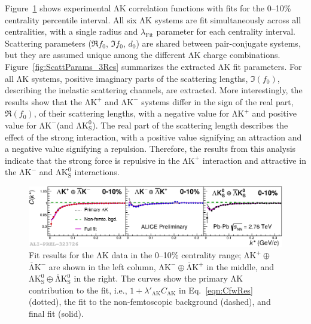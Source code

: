 \documentclass{svproc}
\newcommand{\LamK}{$\mathrm{\Lambda}\mathrm{K}$\xspace}
\newcommand{\LamKchP}{$\mathrm{\Lambda}\mathrm{K^{+}}$\xspace}
\newcommand{\ALamKchM}{$\overline{\mathrm{\Lambda}}\mathrm{K^{-}}$\xspace}
\newcommand{\LamKchM}{$\mathrm{\Lambda}\mathrm{K^{-}}$\xspace}
\newcommand{\ALamKchP}{$\overline{\mathrm{\Lambda}}\mathrm{K^{+}}$\xspace}
\newcommand{\LamKs}{$\mathrm{\Lambda}\mathrm{K^{0}_{S}}$\xspace}
\newcommand{\ALamKs}{$\overline{\mathrm{\Lambda}}\mathrm{K^{0}_{S}}$\xspace}
\begin{document}
Figure~\ref{fig:LamKFits_3Res} shows experimental \LamK correlation functions with fits for the 0--10\% centrality percentile interval.
All six \LamK systems are fit simultaneously across all centralities, with a single radius and $\lambda_{\mathrm{Fit}}$ parameter for each centrality interval.
Scattering parameters ($\Re f_{0}$, $\Im f_{0}$, $d_{0}$) are shared between pair-conjugate systems, but they are assumed unique among the different \LamK charge combinations. 
Figure~\ref{fig:ScattParams_3Res} summarizes the extracted \LamK fit parameters.
For all \LamK systems, positive imaginary parts of the scattering lengths, $\Im(f_{0})$, describing the inelastic scattering channels, are extracted. 
More interestingly, the results show that the \LamKchP and \LamKchM systems differ in the sign of the real part, $\Re(f_{0})$, of their scattering lengths, with a negative value for \LamKchP and positive value for \LamKchM (and \LamKs).
The real part of the scattering length describes the effect of the strong interaction, with a positive value signifying an attraction and a negative value signifying a repulsion.
Therefore, the results from this analysis indicate that the strong force is repulsive in the \LamKchP interaction and attractive in the \LamKchM and \LamKs interactions.
\begin{figure}[h!]
  \centering
  \includegraphics[width=\textwidth]{./Figures/Approved/OtherFormats/EPS/2019-06-11-canKStarCfwFits_CombineConj_0010_LabelLines.eps}
  \caption[\LamK data with fits]
  {
  Fit results for the \LamK data in the 0--10\% centrality range; $\mathrm{\Lambda}\mathrm{K^{+}}\oplus$\ALamKchM are shown in the left column, $\mathrm{\Lambda}\mathrm{K^{-}}\oplus$\ALamKchP in the middle, and $\mathrm{\Lambda}\mathrm{K^{0}_{S}}\oplus$\ALamKs in the right. 
  The curves show the primary \LamK contribution to the fit, i.e., $1 + \lambda'_{\mathrm{\Lambda}\mathrm{K}}C_{\mathrm{\Lambda}\mathrm{K}}$ in Eq.~\ref{eqn:CfwRes} (dotted), the fit to the non-femtoscopic background (dashed), and final fit (solid).
 }
  \label{fig:LamKFits_3Res}
\end{figure}
\end{document}
